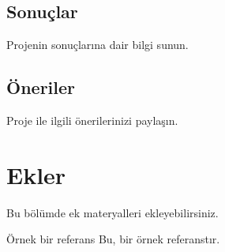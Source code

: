 \documentclass[a4paper,12pt]{report}
\begin{document}
\section{Sonuçlar}
Projenin sonuçlarına dair bilgi sunun.

\section{Öneriler}
Proje ile ilgili önerilerinizi paylaşın.

\appendix
\chapter{Ekler}
Bu bölümde ek materyalleri ekleyebilirsiniz.

\begin{thebibliography}{9}
 Örnek bir referans
Bu, bir örnek referanstır.
\end{thebibliography}
\end{document}
